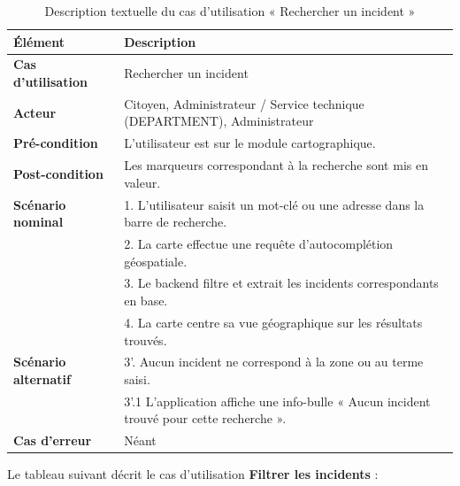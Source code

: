 \begin{table}[H]
    \centering
    \caption{Description textuelle du cas d'utilisation « Rechercher un incident »}
    \label{tab:txt_rech_offre}
    \vspace{0.2cm}
    \small
    \begin{tabularx}{\textwidth}{|l|X|}
        \hline
        \textbf{Élément} & \textbf{Description} \\ \hline
        \textbf{Cas d’utilisation} & Rechercher un incident \\ \hline
        \textbf{Acteur} & Citoyen, Administrateur / Service technique (DEPARTMENT), Administrateur \\ \hline
        \textbf{Pré-condition} & L'utilisateur est sur le module cartographique. \\ \hline
        \textbf{Post-condition} & Les marqueurs correspondant à la recherche sont mis en valeur. \\ \hline
        \textbf{Scénario nominal} &
        1. L'utilisateur saisit un mot-clé ou une adresse dans la barre de recherche.\\
        & 2. La carte effectue une requête d'autocomplétion géospatiale.\\
        & 3. Le backend filtre et extrait les incidents correspondants en base.\\
        & 4. La carte centre sa vue géographique sur les résultats trouvés. \\ \hline
        \textbf{Scénario alternatif} &
        3'. Aucun incident ne correspond à la zone ou au terme saisi.\\
        & 3'.1 L'application affiche une info-bulle « Aucun incident trouvé pour cette recherche ». \\ \hline
        \textbf{Cas d’erreur} & Néant \\ \hline
    \end{tabularx}
\end{table}

Le tableau suivant décrit le cas d'utilisation \textbf{\og Filtrer les incidents \fg{}} :

